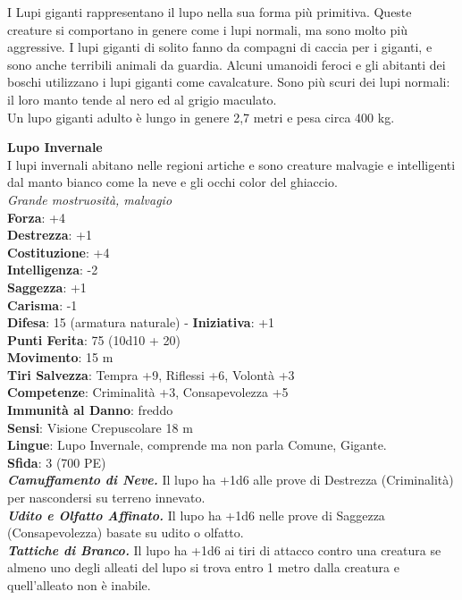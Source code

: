 \begin{multicols}{2}
I Lupi giganti rappresentano il lupo nella sua forma più primitiva. Queste creature si comportano in genere come i lupi normali, ma sono molto più aggressive. I lupi giganti di solito fanno da compagni di caccia per i giganti, e sono anche terribili animali da guardia. Alcuni umanoidi feroci e gli abitanti dei boschi utilizzano i lupi giganti come cavalcature. Sono più scuri dei lupi normali: il loro manto tende al nero ed al grigio maculato.\\

Un lupo giganti adulto è lungo in genere 2,7 metri e pesa circa 400 kg. 

\medskip\textbf{Lupo Invernale}\\
I lupi invernali abitano nelle regioni artiche e sono creature malvagie e intelligenti dal manto bianco come la neve e gli occhi color del ghiaccio.\\
\emph{Grande mostruosità, malvagio}\\
\textbf{Forza}: +4\\
\textbf{Destrezza}: +1\\
\textbf{Costituzione}: +4\\
\textbf{Intelligenza}: -2\\
\textbf{Saggezza}: +1\\
\textbf{Carisma}: -1\\
\textbf{Difesa}: 15 (armatura naturale) - \textbf{Iniziativa}: +1\\
\textbf{Punti Ferita}: 75 (10d10 + 20)\\
\textbf{Movimento}: 15 m\\
\textbf{Tiri Salvezza}: Tempra +9, Riflessi +6, Volontà +3 \\
\textbf{Competenze}: Criminalità +3, Consapevolezza +5\\
\textbf{Immunità al Danno}: freddo\\
\textbf{Sensi}: Visione Crepuscolare 18 m\\
\textbf{Lingue}:  Lupo Invernale, comprende ma non parla Comune, Gigante. \\
\textbf{Sfida}: 3 (700 PE)\smallskip\\
\emph{\textbf{Camuffamento di Neve.}} Il lupo ha +1d6 alle prove di Destrezza (Criminalità) per nascondersi su terreno innevato.\\
\emph{\textbf{Udito e Olfatto Affinato.}} Il lupo ha +1d6 nelle prove di Saggezza (Consapevolezza) basate su udito o olfatto.\\
\emph{\textbf{Tattiche di Branco.}} Il lupo ha +1d6 ai tiri di attacco contro una creatura se almeno uno degli alleati del lupo si trova entro 1 metro dalla creatura e quell'alleato non è inabile.\\

\end{multicols}
